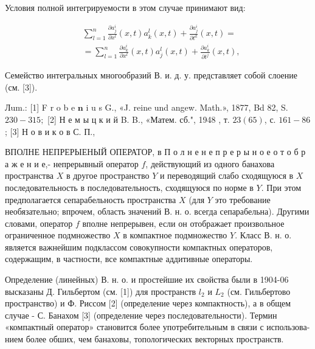\documentclass[10pt]{article}
\begin{document}
Условия полной интегрируемости в этом случае принимают вид:



\[

\begin{aligned}

& \sum_{l=1}^{n} \frac{\partial a_{j}^{i}}{\partial x^{l}}(x, t) a_{k}^{l}(x, t)+\frac{\partial a_{j}^{i}}{\partial t^{k}}(x, t)= \\

& =\sum_{l=1}^{n} \frac{\partial a_{k}^{i}}{\partial x^{l}}(x, t) a_{j}^{l}(x, t)+\frac{\partial a_{k}^{i}}{\partial t^{j}}(x, t),

\end{aligned}

\]



Семейство интегральных многообразий В. и. д. у. представляет собой слоение (см. [3]).



Лum.: [1] F r o b e $\mathbf{n}$ i u s G., «J. reine und angew. Math.», 1877, Bd 82, S. $230-315 ;$ [2] Н е м ы ц к и й B. B., «Матем. сб.", 1948 , т. $23(65)$, с. $161-86$; [3] Н о в и к о в С. П.,



ВПОЛНЕ НЕПРЕРЫЕНЫЙ ОПЕРАТОР, в П о л н е н е п р е р ы н о е о т о б р а ж е н и е,- непрерывный оператор $f$, действующий из одного банахова пространства $X$ в другое пространство $Y$ и переводящий слабо сходящуюся в $X$ последовательность в последовательность, сходящуюся по норме в $Y$. При этом предполагается сепарабельность пространства $X$ (для $Y$ это требование необязательно; впрочем, область значений В. н. о. всегда сепарабельна). Другими словами, оператор $f$ вполне непрерывен, если он отображает произвольное ограниченное подмножество $X$ в компактное подмножество $Y$. Класс В. н. о. является важнейшим подклассом совокупности компактных операторов, содержащим, в частности, все компактные аддитивные операторы.



Определение (линейных) В. н. о. и простейшие их свойства были в 1904-06 высказаны Д. Гильбертом (см. [1]) для пространств $l_{2}$ и $L_{2}$ (см. Гильбертово пространство) и Ф. Риссом [2] (определение через компактность), а в общем случае - С. Банахом [3] (определение через последовательности). Термин «компактный оператор» становится более употребительным в связи с использова- нием более обших, чем банаховы, топологических векторных пространств.
\end{document}
